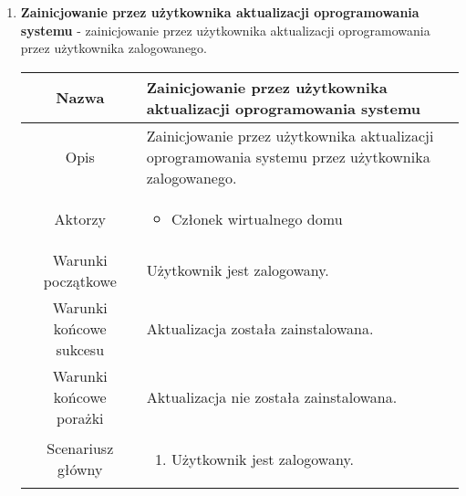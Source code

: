 \documentclass{article}
\begin{document}
\begin{enumerate}
\begin{enumerate}
			\item \textbf{Zainicjowanie przez użytkownika aktualizacji oprogramowania
				systemu} - zainicjowanie przez użytkownika aktualizacji oprogramowania
				przez użytkownika zalogowanego.
				\begin{table}[H]
					\centering
					\begin{tabular}{|c|p{7cm}|}
						\hline
						Nazwa                   & Zainicjowanie przez użytkownika aktualizacji oprogramowania systemu                                                                                                                                                                                                             \\
						\hline
						Opis                    & Zainicjowanie przez użytkownika aktualizacji oprogramowania systemu przez użytkownika zalogowanego.                                                                                                                                                                             \\
						\hline
						Aktorzy                 & \begin{itemize}\item Członek wirtualnego domu\end{itemize}                                                                                                                                                                                                                      \\
						\hline
						Warunki początkowe      & Użytkownik jest zalogowany.                                                                                                                                                                                                                                                     \\
						\hline
						Warunki końcowe sukcesu & Aktualizacja została zainstalowana.                                                                                                                                                                                                                                             \\
						\hline
						Warunki końcowe porażki & Aktualizacja nie została zainstalowana.                                                                                                                                                                                                                                         \\
						\hline
						Scenariusz główny       & \begin{enumerate}\item Użytkownik jest zalogowany.


\end{enumerate}
\end{tabular}
\end{table}
\end{enumerate}
\end{enumerate}
\end{document}
